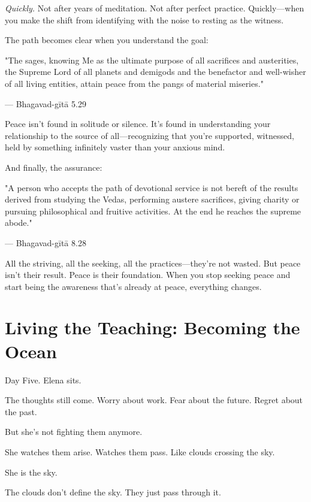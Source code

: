 \documentclass[11pt,twoside]{book}
\begin{document}
\emph{Quickly.} Not after years of meditation. Not after perfect practice. Quickly—when you make the shift from identifying with the noise to resting as the witness.

The path becomes clear when you understand the goal:

\begin{pullquote}
"The sages, knowing Me as the ultimate purpose of all sacrifices and austerities, the Supreme Lord of all planets and demigods and the benefactor and well-wisher of all living entities, attain peace from the pangs of material miseries."

--- Bhagavad-gītā 5.29
\end{pullquote}

Peace isn't found in solitude or silence. It's found in understanding your relationship to the source of all—recognizing that you're supported, witnessed, held by something infinitely vaster than your anxious mind.

And finally, the assurance:

\begin{pullquote}
"A person who accepts the path of devotional service is not bereft of the results derived from studying the Vedas, performing austere sacrifices, giving charity or pursuing philosophical and fruitive activities. At the end he reaches the supreme abode."

--- Bhagavad-gītā 8.28
\end{pullquote}

All the striving, all the seeking, all the practices—they're not wasted. But peace isn't their result. Peace is their foundation. When you stop seeking peace and start being the awareness that's already at peace, everything changes.

\section*{Living the Teaching: Becoming the Ocean}

Day Five. Elena sits.

The thoughts still come. Worry about work. Fear about the future. Regret about the past.

But she's not fighting them anymore.

She watches them arise. Watches them pass. Like clouds crossing the sky.

She is the sky.

The clouds don't define the sky. They just pass through it.
\end{document}
